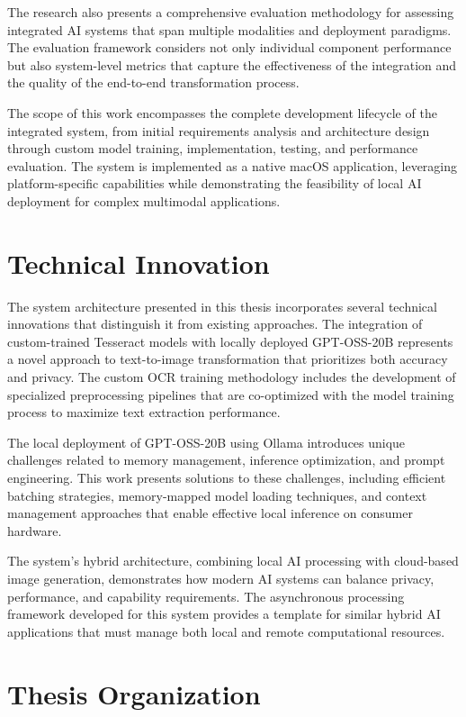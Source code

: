 The research also presents a comprehensive evaluation methodology for assessing integrated AI systems that span multiple modalities and deployment paradigms. The evaluation framework considers not only individual component performance but also system-level metrics that capture the effectiveness of the integration and the quality of the end-to-end transformation process.

The scope of this work encompasses the complete development lifecycle of the integrated system, from initial requirements analysis and architecture design through custom model training, implementation, testing, and performance evaluation. The system is implemented as a native macOS application, leveraging platform-specific capabilities while demonstrating the feasibility of local AI deployment for complex multimodal applications.

\section{Technical Innovation}

The system architecture presented in this thesis incorporates several technical innovations that distinguish it from existing approaches. The integration of custom-trained Tesseract models with locally deployed GPT-OSS-20B represents a novel approach to text-to-image transformation that prioritizes both accuracy and privacy. The custom OCR training methodology includes the development of specialized preprocessing pipelines that are co-optimized with the model training process to maximize text extraction performance.

The local deployment of GPT-OSS-20B using Ollama introduces unique challenges related to memory management, inference optimization, and prompt engineering. This work presents solutions to these challenges, including efficient batching strategies, memory-mapped model loading techniques, and context management approaches that enable effective local inference on consumer hardware.

The system's hybrid architecture, combining local AI processing with cloud-based image generation, demonstrates how modern AI systems can balance privacy, performance, and capability requirements. The asynchronous processing framework developed for this system provides a template for similar hybrid AI applications that must manage both local and remote computational resources.

\section{Thesis Organization}

